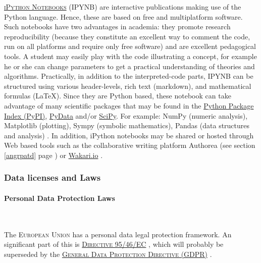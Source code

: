  \textsc{\href{http://ipython.org/notebook.html}{iPython Notebooks}} (IPYNB) are interactive publications making use of the Python language. Hence, these are based on free and multiplatform software. Such notebooks have two advantages in academia: they promote research reproducibility (because they constitute an excellent way to comment the code, run on all platforms and require only free software) and are excellent pedagogical tools. A student may easily play with the code illustrating a concept, for example he or she can change parameters to get a practical understanding of theories and algorithms. Practically, in addition to the interpreted-code parts, IPYNB can be structured using various header-levels, rich text (markdown), and mathematical formulas (\LaTeX). Since they are Python based, these notebook can take advantage of many scientific packages that may be found in the \href{https://pypi.python.org/pypi}{Python Package Index (PyPI)}, \href{http://pydata.org/downloads/}{PyData} and/or \href{http://www.scipy.org/}{SciPy}. For example: NumPy (numeric analysis), Matplotlib (plotting), Sympy (symbolic mathematics), Pandas (data structures and analysis) \cite{numpy_numpy_2015,python_software_foundation_python.org_2015}. In addition, iPython notebooks may be shared or hosted through Web based tools such as the collaborative writing platform Authorea (see section \ref{angrpatd} page \pageref{angrpatd}) or \href{https://wakari.io/}{Wakari.io} \cite{wikipedia_ipython_2015,ipython.org_ipython_2015}.

\subsubsection{Data licenses and Laws}

\paragraph{Personal Data Protection Laws}

~

\noindent {} The \textsc{European Union} has a personal data legal protection framework. An significant part of this is \textsc{\href{http://eur-lex.europa.eu/LexUriServ/LexUriServ.do?uri=CELEX:31995L0046:en:HTML}{Directive 95/46/EC}} \cite{eurlex_9546ec_1995}, which will probably be superseded by the \textsc{\href{https://en.wikipedia.org/wiki/General_Data_Protection_Regulation}{General Data Protection Directive (GDPR)}} \cite{wikipedia_general_2015}.

